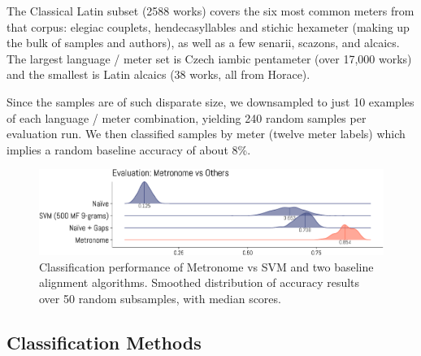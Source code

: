 \documentclass[
    hf
]{ceurart}
\begin{document}
The Classical Latin subset (2588 works) covers the six most common meters from that corpus: elegiac couplets, hendecasyllables and stichic hexameter (making up the bulk of samples and authors), as well as a few senarii, scazons, and alcaics. The largest language / meter set is Czech iambic pentameter (over 17,000 works) and the smallest is Latin alcaics (38 works, all from Horace).

Since the samples are of such disparate size, we downsampled to just 10 examples of each language / meter combination, yielding 240 random samples per evaluation run. We then classified samples by meter (twelve meter labels) which implies a random baseline accuracy of about 8\%.

\begin{figure}
    \includegraphics[width=\linewidth]{figures/evaluation-crop.pdf}
    \caption{Classification performance of Metronome vs SVM and two baseline alignment algorithms. Smoothed distribution of accuracy results over 50 random subsamples, with median scores.}
    \label{fig:eval}
\end{figure}

\subsection{Classification Methods}
\end{document}
